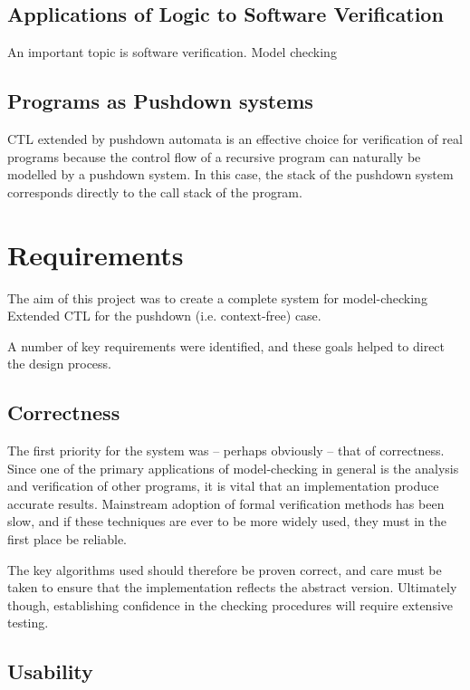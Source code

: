 \documentclass[11pt]{article}
\theoremstyle{definition}
\begin{document}
\subsection{Applications of Logic to Software Verification}

An important topic 
is software verification.
Model checking



\subsection{Programs as Pushdown systems}

CTL extended by pushdown automata is an effective choice for verification of
real programs because the control flow of a recursive program can naturally be
modelled by a pushdown system. In this case, the stack of the pushdown system
corresponds directly to the call stack of the program.



\section{Requirements}

The aim of this project was to create a complete system for model-checking
Extended CTL for the pushdown (i.e. context-free) case. 

A number of key requirements were identified, and these goals helped to direct
the design process. 

\subsection{Correctness}

The first priority for the system was -- perhaps obviously -- that of
correctness. Since one of the primary applications of model-checking in general
is the analysis and verification of other programs, it is vital that an
implementation produce accurate results. Mainstream adoption of formal
verification methods has been slow\cite{mitra2008strategies}, and if these
techniques are ever to be more widely used, they must in the first place be
reliable.

The key algorithms used should therefore be proven correct, and care must be
taken to ensure that the implementation reflects the abstract version.
Ultimately though, establishing confidence in the checking procedures will
require extensive testing.

\subsection{Usability}
\end{document}
